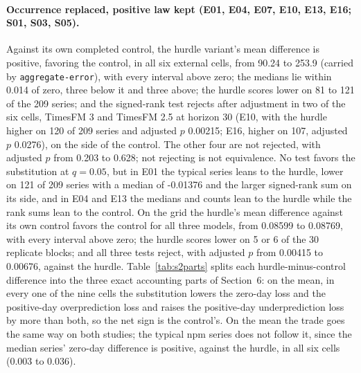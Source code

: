 \paragraph{Occurrence replaced, positive law kept (E01, E04, E07, E10, E13, E16; S01, S03, S05).} Against
its own completed control, the hurdle variant's mean difference is positive, favoring the control, in all six
external cells, from 90.24 to 253.9 (carried by \texttt{aggregate-error}), with every interval above zero;
the medians lie within 0.014 of zero, three below it and three above; the hurdle scores lower on 81 to 121
of the 209 series; and the signed-rank test rejects after adjustment in two of the six cells, TimesFM 3 and
TimesFM 2.5 at horizon 30 (E10, with the hurdle higher on 120 of 209 series and adjusted $p$ 0.00215; E16,
higher on 107, adjusted $p$ 0.0276), on the side of the control. The other four are not rejected, with
adjusted $p$ from 0.203 to 0.628; not rejecting is not equivalence. No test favors the substitution at
$q = 0.05$, but in E01 the typical series leans to the hurdle, lower on 121 of 209 series with a median of
-0.01376 and the larger signed-rank sum on its side, and in E04 and E13 the medians and counts lean to the
hurdle while the rank sums lean to the control. On the grid the hurdle's mean difference against its own
control favors the control for all three models, from 0.08599 to 0.08769, with every interval above zero;
the hurdle scores lower on 5 or 6 of the 30 replicate blocks; and all three tests reject, with adjusted $p$
from 0.00415 to 0.00676, against the hurdle. Table~\ref{tab:s2parts} splits each hurdle-minus-control
difference into the three exact accounting parts of Section~6: on the mean, in every one of the nine cells
the substitution lowers the zero-day loss and the positive-day overprediction loss and raises the
positive-day underprediction loss by more than both, so the net sign is the control's. On the mean the trade
goes the same way on both studies; the typical npm series does not follow it, since the median series'
zero-day difference is positive, against the hurdle, in all six cells (0.003 to 0.036).

